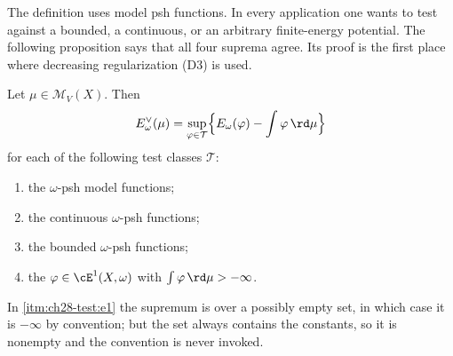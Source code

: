 The definition uses model psh functions.  In every application one wants to
test against a bounded, a continuous, or an arbitrary finite-energy
potential.  The following proposition says that all four suprema agree.  Its
proof is the first place where decreasing regularization
\textup{(D3)} is used.

\begin{proposition}
\label{prop:ch28-test-class}
Let \(\mu\in\mathcal M_V(X)\).  Then
\begin{equation}
\label{eq:ch28-test-class}
 E^\vee_\omega(\mu)
 =\sup_{\varphi\in\mathcal T}
   \Bigl\{E_\omega(\varphi)-\int\varphi\,\rd\mu\Bigr\}
\end{equation}
for each of the following test classes \(\mathcal T\):
\begin{enumerate}
\item\label{itm:ch28-test:model}
 the \(\omega\)-psh model functions;
\item\label{itm:ch28-test:cont}
 the continuous \(\omega\)-psh functions;
\item\label{itm:ch28-test:bdd}
 the bounded \(\omega\)-psh functions;
\item\label{itm:ch28-test:e1}
 the \(\varphi\in\cE^1(X,\omega)\) with \(\int\varphi\,\rd\mu>-\infty\).
\end{enumerate}
In \cref{itm:ch28-test:e1} the supremum is over a possibly empty set, in
which case it is \(-\infty\) by convention; but the set always contains the
constants, so it is nonempty and the convention is never invoked.
\end{proposition}

